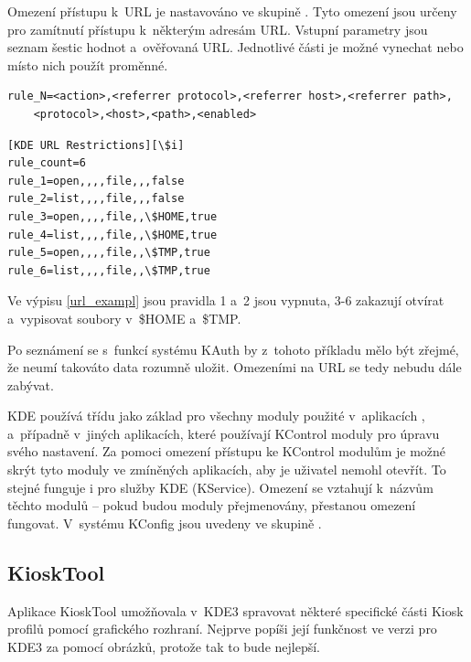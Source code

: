 Omezení přístupu k~URL je nastavováno ve skupině . Tyto omezení jsou určeny pro zamítnutí přístupu k~některým adresám URL. Vstupní parametry jsou seznam šestic hodnot a~ověřovaná URL. Jednotlivé části je možné vynechat nebo místo nich použít proměnné.
\begin{mylisting}
\caption{Syntaxe pro zápis omezení URL}
\label{url_syntax}
\begin{lstlisting}
rule_N=<action>,<referrer protocol>,<referrer host>,<referrer path>,
    <protocol>,<host>,<path>,<enabled>
\end{lstlisting}
\end{mylisting}

\begin{mylisting}
\caption{Ukázka zápisu omezení URL}
\label{url_exampl}
\begin{lstlisting}
[KDE URL Restrictions][\$i]
rule_count=6
rule_1=open,,,,file,,,false
rule_2=list,,,,file,,,false
rule_3=open,,,,file,,\$HOME,true
rule_4=list,,,,file,,\$HOME,true
rule_5=open,,,,file,,\$TMP,true
rule_6=list,,,,file,,\$TMP,true
\end{lstlisting}
\end{mylisting}
Ve výpisu \ref{url_exampl} jsou pravidla 1 a~2 jsou vypnuta, 3-6 zakazují otvírat a~vypisovat soubory
v~\$HOME a~\$TMP.

Po seznámení se s~funkcí systému KAuth by z~tohoto příkladu mělo být zřejmé, že neumí takováto data rozumně uložit. Omezeními na URL se tedy nebudu dále zabývat.

KDE používá třídu  jako základ pro všechny moduly použité v~aplikacích ,  a~případně v~jiných aplikacích, které používají KControl moduly pro úpravu svého nastavení. Za pomoci omezení přístupu ke KControl modulům je možné skrýt tyto moduly ve zmíněných aplikacích, aby je uživatel nemohl otevřít. To stejné funguje i pro služby KDE (KService). Omezení se vztahují k~názvům těchto modulů -- pokud budou moduly přejmenovány, přestanou omezení fungovat. V~systému KConfig jsou uvedeny ve skupině .

\subsection{KioskTool}
Aplikace KioskTool umožňovala v~KDE3 spravovat některé specifické části Kiosk profilů pomocí grafického rozhraní. Nejprve popíši její funkčnost ve verzi pro KDE3 za pomocí obrázků, protože tak to bude nejlepší.

